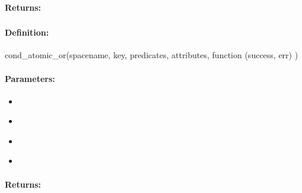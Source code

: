 \paragraph{Returns:}


\pagebreak
\subsubsection{}
\label{api:nodejs:cond_atomic_or}


\paragraph{Definition:}
\begin{javascriptcode}
cond_atomic_or(spacename, key, predicates, attributes, function (success, err) {})
\end{javascriptcode}
\paragraph{Parameters:}
\begin{itemize}[noitemsep]
\item {}\\

\item {}\\

\item {}\\

\item {}\\

\end{itemize}

\paragraph{Returns:}


\pagebreak
\subsubsection{}
\label{api:nodejs:group_atomic_or}


